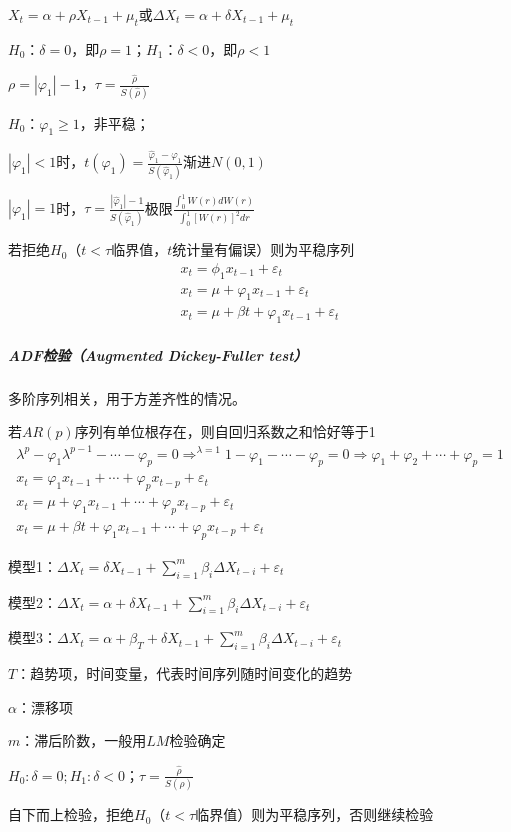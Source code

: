 \documentclass[12pt]{book}
\begin{document}
\par $X_t=\alpha+\rho X_{t-1}+\mu_t$或$\Delta X_t=\alpha +\delta X_{t-1}+\mu _{t}$  
\par $H_0$：$\delta =0$，即$\rho =1$；$H_1$：$\delta <0$，即$\rho <1$  
\par $\rho=\left|\varphi_1\right|-1， \tau=\frac{\hat{\rho}}{S(\hat{\rho})}$  
\par $H_0$：$\varphi _1≥1$，非平稳；  
\par $\left|\varphi_1\right|<1$时，$t(\varphi _1)=\frac{\hat{\varphi }_1-\varphi _1}{S(\hat{\varphi }_1)}$渐进$N(0,1)$  
\par $\left|\varphi_1\right|=1$时，$\tau =\frac{|\hat{\varphi  }_1|-1}{S(\hat{\varphi }_1)}$极限$\frac{\int_{0}^{1}W(r)dW(r)}{\int_{0}^{1}[W(r)]^2dr}$  
\par 若拒绝$H_0$（$t<\tau$临界值，$t$统计量有偏误）则为平稳序列  
\begin{gather*}
x_t=\phi_{1}x_{t-1}+\varepsilon_t\\
x_t=\mu+\varphi_{1}x_{t-1}+\varepsilon_t\\
x_t=\mu+\beta t+\varphi_{1}x_{t-1}+\varepsilon_t
\end{gather*}


\subparagraph{ADF检验（Augmented Dickey-Fuller test）}

多阶序列相关，用于方差齐性的情况。

若$AR(p)$序列有单位根存在，则自回归系数之和恰好等于1  
\begin{gather*}
    \lambda^p-\varphi_1\lambda^{p-1}-\cdots-\varphi_p=0
    \Rightarrow^{\lambda=1} 1-\varphi_1-\cdots-\varphi_p=0
    \Rightarrow\varphi_1+\varphi_2+\cdots+\varphi_p=1\\
    x_t=\varphi_{1}x_{t-1}+\cdots+\varphi_{p}x_{t-p}+\varepsilon_t\\
    x_t=\mu+\varphi_{1}x_{t-1}+\cdots+\varphi_{p}x_{t-p}+\varepsilon_t \\
    x_t=\mu+\beta t+\varphi_{1}x_{t-1}+\cdots+\varphi_{p}x_{t-p}+\varepsilon_t
\end{gather*}


 
\par 模型1：$\Delta X_t=\delta X_{t-1}+\sum_{i=1}^{m}\beta _i\Delta X_{t-i}+\varepsilon _t$  
\par 模型2：$\Delta X_t=\alpha +\delta X_{t-1}+\sum_{i=1}^{m}\beta _i\Delta X_{t-i}+\varepsilon _{t}$  
\par 模型3：$\Delta X_t=\alpha +\beta _T+\delta X_{t-1}+\sum_{i=1}^{m}\beta _i\Delta X_{t-i}+\varepsilon _{t}$  
\par $T$：趋势项，时间变量，代表时间序列随时间变化的趋势  
\par $\alpha$：漂移项   
\par $m$：滞后阶数，一般用$LM$检验确定  
\par $H_0:\delta =0; H_1:\delta <0$；$\tau=\frac{\hat{\rho}}{S(\hat{\rho})}$  
\par 自下而上检验，拒绝$H_0$（$t<\tau$临界值）则为平稳序列，否则继续检验
\end{document}
